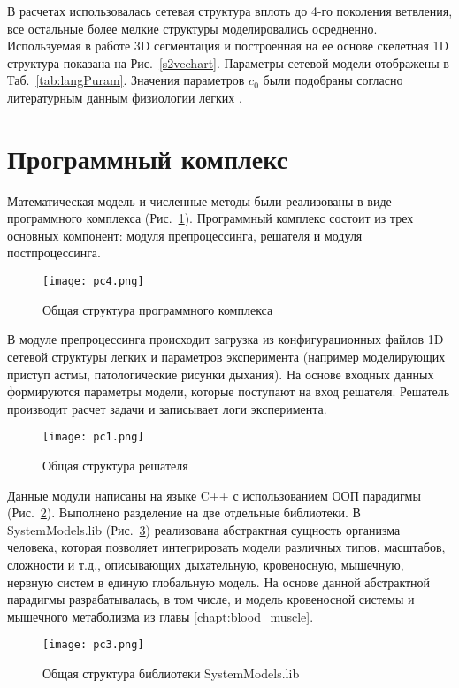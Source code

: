 В расчетах использовалась сетевая структура вплоть до 4-го поколения ветвления, все остальные более мелкие структуры моделировались осредненно. Используемая в работе 3D сегментация и построенная на ее основе скелетная 1D структура показана на  Рис.~\ref{s2vechart}. Параметры сетевой модели отображены в Таб.~\ref{tab:langPuram}. Значения параметров $c_{0} $ были подобраны согласно литературным данным физиологии легких \cite{schmidt,Mead1961}.

\section{Программный комплекс}
\label{lung:soft}
Математическая модель и численные методы были реализованы в виде программного комплекса (Рис.~\ref{fig:soft_lung}). Программный комплекс состоит из трех основных компонент: модуля препроцессинга, решателя и модуля постпроцессинга. 
\begin{figure}[!ht]
	\centering
	\texttt{[image: pc4.png]}
	\caption{Общая структура программного комплекса} \label{fig:soft_lung}
\end{figure}
В модуле препроцессинга происходит загрузка из конфигурационных файлов 1D сетевой структуры легких и параметров эксперимента (например моделирующих приступ астмы, патологические рисунки дыхания). На основе входных данных формируются параметры модели, которые поступают на вход решателя. Решатель производит расчет задачи и записывает логи эксперимента.
\begin{figure}[!ht]
	\centering
	\texttt{[image: pc1.png]}
	\caption{Общая структура решателя} \label{fig:soft_solver}
\end{figure}
Данные модули написаны на языке C++ с использованием ООП парадигмы (Рис.~\ref{fig:soft_solver}). Выполнено разделение на две отдельные библиотеки.  В SystemModels.lib (Рис.~\ref{fig:soft_systems}) реализована абстрактная сущность организма человека, которая позволяет интегрировать  модели различных типов, масштабов, сложности и т.д., описывающих дыхательную, кровеносную, мышечную, нервную систем в единую глобальную модель. На основе данной абстрактной парадигмы разрабатывалась, в том числе, и модель кровеносной системы и мышечного метаболизма из главы \ref{chapt:blood_muscle}.  
\begin{figure}[!ht]
	\centering
	\texttt{[image: pc3.png]}
	\caption{Общая структура библиотеки SystemModels.lib} \label{fig:soft_systems}
\end{figure}

